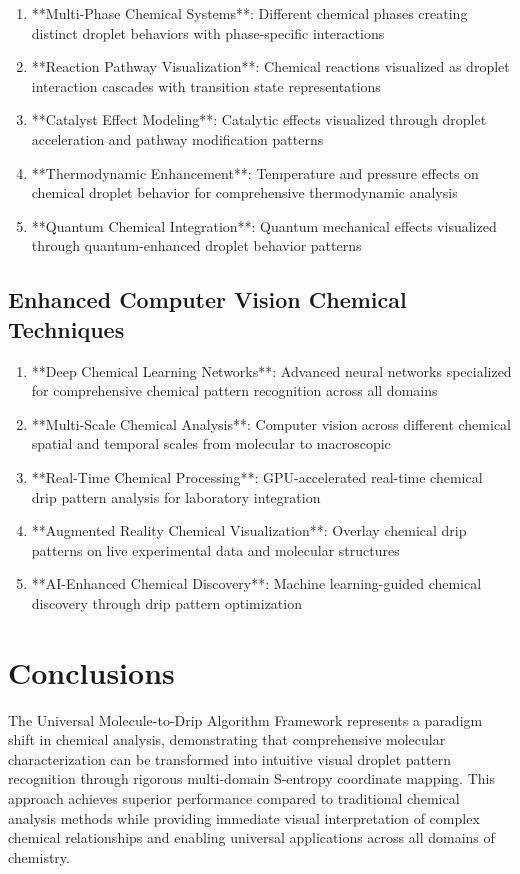 \documentclass[12pt,a4paper]{article}
\begin{document}
\begin{algorithm}
\begin{algorithmic}[1]
\begin{table}[H]
\begin{table}[H]
\begin{table}[H]
{{{\begin{enumerate}
\item **Multi-Phase Chemical Systems**: Different chemical phases creating distinct droplet behaviors with phase-specific interactions
\item **Reaction Pathway Visualization**: Chemical reactions visualized as droplet interaction cascades with transition state representations
\item **Catalyst Effect Modeling**: Catalytic effects visualized through droplet acceleration and pathway modification patterns
\item **Thermodynamic Enhancement**: Temperature and pressure effects on chemical droplet behavior for comprehensive thermodynamic analysis
\item **Quantum Chemical Integration**: Quantum mechanical effects visualized through quantum-enhanced droplet behavior patterns
\end{enumerate}

\subsection{Enhanced Computer Vision Chemical Techniques}

\begin{enumerate}
\item **Deep Chemical Learning Networks**: Advanced neural networks specialized for comprehensive chemical pattern recognition across all domains
\item **Multi-Scale Chemical Analysis**: Computer vision across different chemical spatial and temporal scales from molecular to macroscopic
\item **Real-Time Chemical Processing**: GPU-accelerated real-time chemical drip pattern analysis for laboratory integration
\item **Augmented Reality Chemical Visualization**: Overlay chemical drip patterns on live experimental data and molecular structures
\item **AI-Enhanced Chemical Discovery**: Machine learning-guided chemical discovery through drip pattern optimization
\end{enumerate}

\section{Conclusions}

The Universal Molecule-to-Drip Algorithm Framework represents a paradigm shift in chemical analysis, demonstrating that comprehensive molecular characterization can be transformed into intuitive visual droplet pattern recognition through rigorous multi-domain S-entropy coordinate mapping. This approach achieves superior performance compared to traditional chemical analysis methods while providing immediate visual interpretation of complex chemical relationships and enabling universal applications across all domains of chemistry.

}}}
\end{table}
\end{table}
\end{table}
\end{algorithmic}
\end{algorithm}
\end{document}
